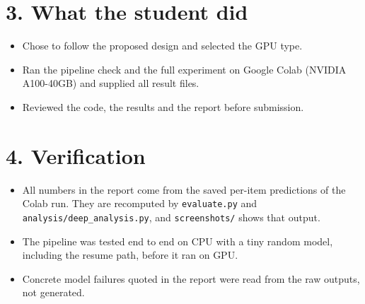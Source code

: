 \documentclass[11pt,a4paper]{article}
\begin{document}
\section*{3. What the student did}
\begin{itemize}
\item Chose to follow the proposed design and selected the GPU type.
\item Ran the pipeline check and the full experiment on Google Colab (NVIDIA A100-40GB) and supplied all result files.
\item Reviewed the code, the results and the report before submission.
\end{itemize}

\section*{4. Verification}
\begin{itemize}
\item All numbers in the report come from the saved per-item predictions of the Colab run. They are
recomputed by \texttt{evaluate.py} and \texttt{analysis/deep\_analysis.py}, and \texttt{screenshots/} shows that output.
\item The pipeline was tested end to end on CPU with a tiny random model, including the resume path,
before it ran on GPU.
\item Concrete model failures quoted in the report were read from the raw outputs, not generated.
\end{itemize}
\end{document}
